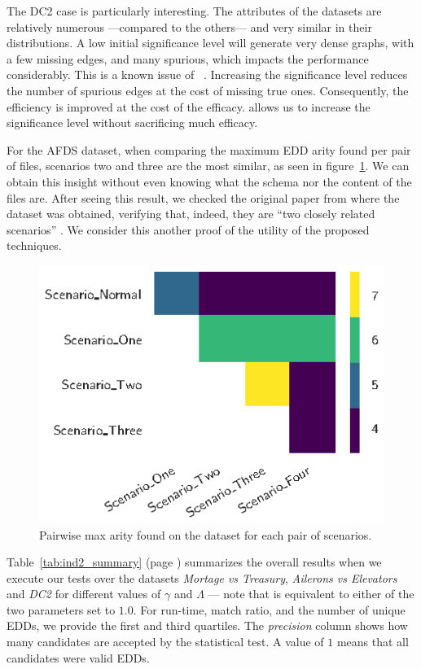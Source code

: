 The DC2 case is particularly interesting. The attributes of the datasets
are relatively numerous ---compared to the others--- and very similar in their distributions.
A low initial significance level will generate very dense graphs, with a few missing edges, and
many spurious, which impacts the performance considerably.
This is a known issue of \Find~\cite{koeller2006heuristic}.
Increasing the significance level reduces the number of spurious edges at the cost of
missing true ones. Consequently, the efficiency is improved at the cost of the efficacy.
\PresQ allows us to increase the significance
level without sacrificing much efficacy.

For the \gls{AFDS} dataset, when comparing the maximum \gls{EDD} arity found per pair of files,
scenarios two and three are the most similar, as seen in figure~\ref{fig:afds}.
We can obtain this insight without even knowing what the schema nor the content of the files are.
After seeing this result, we checked the original paper from
where the dataset was obtained, verifying that, indeed, they are
``two closely related scenarios'' \cite{Gheraibia2019}.
We consider this another proof of the utility of the proposed techniques.


\begin{figure}[ht]
    \centering
    \includegraphics[width=0.5\linewidth]{images/5_presq/afds}
    \caption{
        Pairwise max arity found on the  dataset for each pair of scenarios.
    }
    \label{fig:afds}
\end{figure}

Table~\ref{tab:ind2_summary} (page \pageref{tab:ind2_summary}) summarizes
the overall results when
we execute our tests over the datasets \emph{Mortage vs Treasury},
\emph{Ailerons vs Elevators} and \emph{DC2} for different values of $\gamma$ and $\Lambda$ ---
note that \Find is equivalent to either of the two parameters set to $1.0$. For run-time,
match ratio, and the number of unique \glspl{EDD}, we provide the first and third quartiles.
The \emph{precision} column shows how many candidates are accepted by the
statistical test. A value of $1$ means that all candidates were valid \glspl{EDD}.

